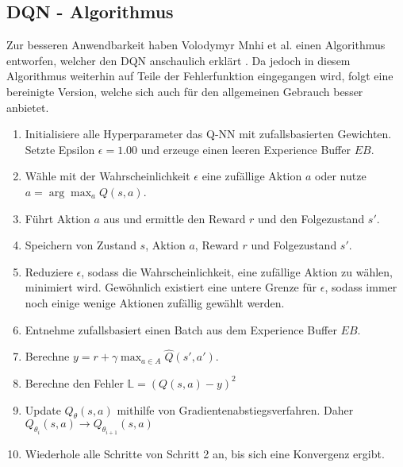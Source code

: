 \subsection{DQN - Algorithmus} \label{subsec:Grundlagen_DQN_Algorithmus}
Zur besseren Anwendbarkeit haben Volodymyr Mnhi et al. einen Algorithmus entworfen, welcher den DQN anschaulich erklärt \citep{DBLP:journals/corr/MnihKSGAWR13}. Da jedoch in diesem Algorithmus weiterhin auf Teile der Fehlerfunktion eingegangen wird, folgt eine bereinigte Version, welche sich auch für den allgemeinen Gebrauch besser anbietet. \citep[S. 149 f.]{DRL_Lapan}
\begin{enumerate} 
	\item Initialisiere alle Hyperparameter das Q-NN mit zufallsbasierten Gewichten. Setzte Epsilon $\epsilon = 1.00$ und erzeuge einen leeren Experience Buffer $EB$.
	\item Wähle mit der Wahrscheinlichkeit $\epsilon$ eine zufällige Aktion $a$ oder nutze $a = \arg\max_{a} Q(s,a)$.
	\item Führt Aktion $a$ aus und ermittle den Reward $r$ und den Folgezustand $s'$.
	\item Speichern von Zustand $s$, Aktion $a$, Reward $r$ und Folgezustand $s'$.
	\item Reduziere $\epsilon$, sodass die Wahrscheinlichkeit, eine zufällige Aktion zu wählen, minimiert wird. Gewöhnlich existiert eine untere Grenze für $\epsilon$, sodass immer noch einige wenige Aktionen zufällig gewählt werden.
	\item Entnehme zufallsbasiert einen Batch aus dem Experience Buffer $EB$.
	\item Berechne $y = r + \gamma \max_{a \in A}\hat{Q}(s',a')$.
	\item Berechne den Fehler $\mathbb{L} = (Q(s,a) - y)^2$
	\item Update $Q_\theta(s,a)$ mithilfe von Gradientenabstiegsverfahren. Daher $Q_{\theta_{i}}(s,a) \longrightarrow Q_{\theta_{i+1}}(s,a)$
	\item Wiederhole alle Schritte von Schritt 2 an, bis sich eine Konvergenz ergibt.
\end{enumerate}
